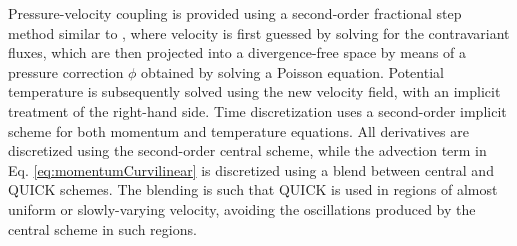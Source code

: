 \documentclass[journal abbreviation, manuscript]{copernicus}
\begin{document}
Pressure-velocity coupling is provided using a second-order fractional step method similar to \cite{1986_vanKan}, where velocity is first guessed by solving for the contravariant fluxes, which are then projected into a divergence-free space by means of a pressure correction $\phi$ obtained by solving a Poisson equation. Potential temperature is subsequently solved using the new velocity field, with an implicit treatment of the right-hand side. Time discretization uses a second-order implicit scheme for both momentum and temperature equations. All derivatives are discretized using the second-order central scheme, while the advection term in Eq. \ref{eq:momentumCurvilinear} is discretized using a blend between central and QUICK \citep{1979_Leonard} schemes. The blending is such that  QUICK is used in regions of almost uniform or slowly-varying velocity, avoiding the oscillations produced by the central scheme in such regions. 
\end{document}
